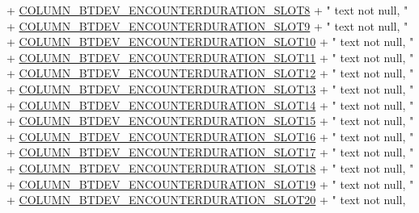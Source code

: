 \begin{DoxyCode}
            + \hyperlink{classcs_1_1usense_1_1db_1_1_usense_s_q_lite_helper_ac1e829aa4cccca38913c92db7df8b9d7}{COLUMN\_BTDEV\_ENCOUNTERDURATION\_SLOT8} + \textcolor{stringliteral}{" text not null, "}
            + \hyperlink{classcs_1_1usense_1_1db_1_1_usense_s_q_lite_helper_a62f005532947043d542f70863554121c}{COLUMN\_BTDEV\_ENCOUNTERDURATION\_SLOT9} + \textcolor{stringliteral}{" text not null, "}
            + \hyperlink{classcs_1_1usense_1_1db_1_1_usense_s_q_lite_helper_a8f0570557668c9f71c70753cdd9e121b}{COLUMN\_BTDEV\_ENCOUNTERDURATION\_SLOT10} + \textcolor{stringliteral}{" text not null,
       "}
            + \hyperlink{classcs_1_1usense_1_1db_1_1_usense_s_q_lite_helper_a9575b194bbe7dde54f677cf183360076}{COLUMN\_BTDEV\_ENCOUNTERDURATION\_SLOT11} + \textcolor{stringliteral}{" text not null,
       "}
            + \hyperlink{classcs_1_1usense_1_1db_1_1_usense_s_q_lite_helper_ab468cb5fb3ba785de4f22692cd268900}{COLUMN\_BTDEV\_ENCOUNTERDURATION\_SLOT12} + \textcolor{stringliteral}{" text not null,
       "}
            + \hyperlink{classcs_1_1usense_1_1db_1_1_usense_s_q_lite_helper_a59f39ee52f78d302d087c752b7ae4743}{COLUMN\_BTDEV\_ENCOUNTERDURATION\_SLOT13} + \textcolor{stringliteral}{" text not null,
       "}
            + \hyperlink{classcs_1_1usense_1_1db_1_1_usense_s_q_lite_helper_a070fcefc99f7a5e5815199cc797c3f08}{COLUMN\_BTDEV\_ENCOUNTERDURATION\_SLOT14} + \textcolor{stringliteral}{" text not null,
       "}
            + \hyperlink{classcs_1_1usense_1_1db_1_1_usense_s_q_lite_helper_a2dbe54ef35e5aa04d56db8c5a0296d01}{COLUMN\_BTDEV\_ENCOUNTERDURATION\_SLOT15} + \textcolor{stringliteral}{" text not null,
       "}
            + \hyperlink{classcs_1_1usense_1_1db_1_1_usense_s_q_lite_helper_a589e1ad81c339909353b98852a8c9dc7}{COLUMN\_BTDEV\_ENCOUNTERDURATION\_SLOT16} + \textcolor{stringliteral}{" text not null,
       "}
            + \hyperlink{classcs_1_1usense_1_1db_1_1_usense_s_q_lite_helper_a92d8f84631c8f26af203b9018ccf7487}{COLUMN\_BTDEV\_ENCOUNTERDURATION\_SLOT17} + \textcolor{stringliteral}{" text not null,
       "}
            + \hyperlink{classcs_1_1usense_1_1db_1_1_usense_s_q_lite_helper_a1d79ad971cd9048a16767dffda6a15b1}{COLUMN\_BTDEV\_ENCOUNTERDURATION\_SLOT18} + \textcolor{stringliteral}{" text not null,
       "}
            + \hyperlink{classcs_1_1usense_1_1db_1_1_usense_s_q_lite_helper_a820e28ca3b35a3a1dc24bbe8fee31e56}{COLUMN\_BTDEV\_ENCOUNTERDURATION\_SLOT19} + \textcolor{stringliteral}{" text not null,
       "}
            + \hyperlink{classcs_1_1usense_1_1db_1_1_usense_s_q_lite_helper_a2128f0b8e043fdd59f06d1165073646e}{COLUMN\_BTDEV\_ENCOUNTERDURATION\_SLOT20} + \textcolor{stringliteral}{" text not null,
}
\end{DoxyCode}
